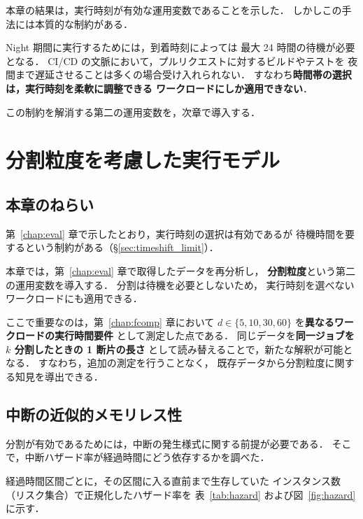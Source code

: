 \documentclass[11pt,a4paper]{ltjsreport}
\begin{document}
本章の結果は，実行時刻が有効な運用変数であることを示した．
しかしこの手法には本質的な制約がある．

Night 期間に実行するためには，到着時刻によっては
最大 24 時間の待機が必要となる．
CI/CD の文脈において，プルリクエストに対するビルドやテストを
夜間まで遅延させることは多くの場合受け入れられない．
すなわち\textbf{時間帯の選択は，実行時刻を柔軟に調整できる
ワークロードにしか適用できない}．

この制約を解消する第二の運用変数を，次章で導入する．

\chapter{分割粒度を考慮した実行モデル}
\label{chap:split}

\section{本章のねらい}

第~\ref{chap:eval} 章で示したとおり，実行時刻の選択は有効であるが
待機時間を要するという制約がある（\S\ref{sec:timeshift_limit}）．

本章では，第~\ref{chap:eval} 章で取得したデータを再分析し，
\textbf{分割粒度}という第二の運用変数を導入する．
分割は待機を必要としないため，
実行時刻を選べないワークロードにも適用できる．

ここで重要なのは，第~\ref{chap:fcomp} 章において
$d \in \{5,10,30,60\}$ を\textbf{異なるワークロードの実行時間要件}
として測定した点である．
同じデータを\textbf{同一ジョブを $k$ 分割したときの 1 断片の長さ}
として読み替えることで，新たな解釈が可能となる．
すなわち，追加の測定を行うことなく，
既存データから分割粒度に関する知見を導出できる．

\section{中断の近似的メモリレス性}
\label{sec:memoryless}

分割が有効であるためには，中断の発生様式に関する前提が必要である．
そこで，中断ハザード率が経過時間にどう依存するかを調べた．

経過時間区間ごとに，その区間に入る直前まで生存していた
インスタンス数（リスク集合）で正規化したハザード率を
表~\ref{tab:hazard} および図~\ref{fig:hazard} に示す．
\end{document}
